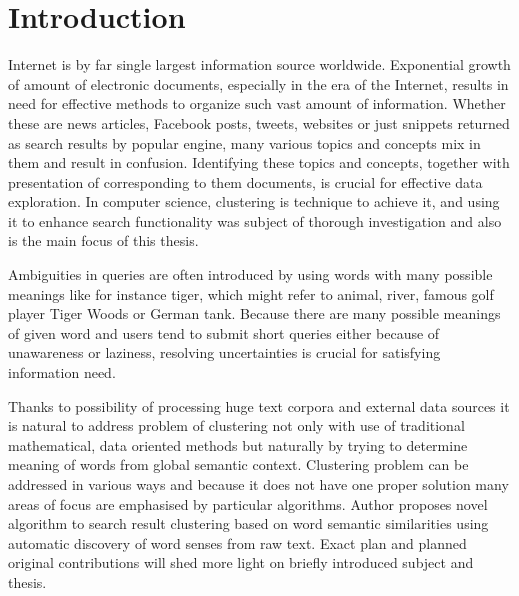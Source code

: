 \documentclass[a4paper, 12pt, oneside]{Thesis} %
\begin{document}


\lhead{\leftmark}


\pagestyle{fancy} %


\chapter{Introduction} Internet is by far single largest information source worldwide. Exponential growth of amount of electronic documents, especially in the era of the Internet, results in need for effective methods to organize such vast amount of information. Whether these are news articles, Facebook posts, tweets, websites or just snippets returned as search results by popular engine, many various topics and concepts mix in them and result in confusion. Identifying these topics and concepts, together with presentation of corresponding to them documents, is crucial for effective data exploration. In computer science, clustering is technique to achieve it, and using it to enhance search functionality was subject of thorough investigation and also is the main focus of this thesis. 

Ambiguities in queries are often introduced by using words with many possible meanings like for instance tiger, which might refer to animal, river, famous golf player Tiger Woods or German tank. Because there are many possible meanings of given word and users tend to submit short queries either because of unawareness or laziness, resolving uncertainties is crucial for satisfying information need.

Thanks to possibility of processing huge text corpora and external data sources it is natural to address problem of clustering not only with use of traditional mathematical, data oriented methods but naturally by trying to determine meaning of words from global semantic context. Clustering problem can be addressed in various ways and because it does not have one proper solution many areas of focus are emphasised by particular algorithms. Author proposes novel algorithm to search result clustering based on word semantic similarities using automatic discovery of word senses from raw text. Exact plan and planned original contributions will shed more light on briefly introduced subject and thesis.
\end{document}
